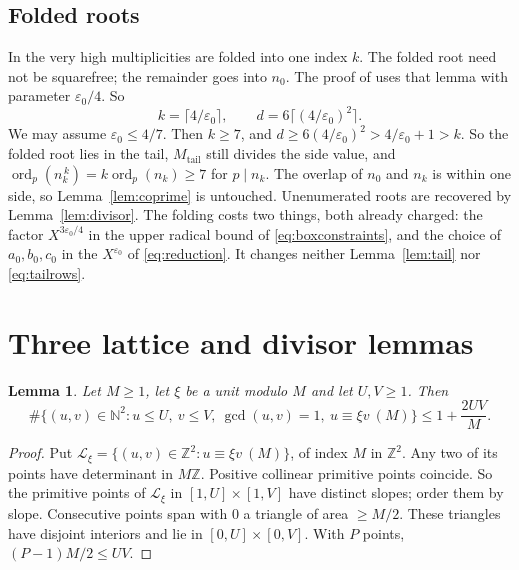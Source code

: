 \documentclass{amsart}
\newtheorem{lemma}{Lemma}[section]
\numberwithin{equation}{section}
\numberwithin{table}{section}
\newcommand{\Z}{\mathbb{Z}}
\newcommand{\N}{\mathbb{N}}
\begin{document}
\subsection{Folded roots}\label{sec:fold}
In \cite[Lemma~2.2]{BBLT} the very high multiplicities are folded into one
index $k$. The folded root need not be squarefree; the remainder goes into
$n_0$. The proof of \cite[Proposition~2.1]{BBLT} uses that lemma with
parameter $\varepsilon_0/4$. So
\[
 k=\lceil4/\varepsilon_0\rceil,\qquad d=6\lceil(4/\varepsilon_0)^{2}\rceil .
\]
We may assume $\varepsilon_0\le4/7$. Then $k\ge7$, and
$d\ge6(4/\varepsilon_0)^2>4/\varepsilon_0+1>k$. So the folded root lies in the
tail, $M_{\mathrm{tail}}$ still divides the side value, and
$\operatorname{ord}_p(n_k^{\,k})=k\operatorname{ord}_p(n_k)\ge7$ for
$p\mid n_k$. The overlap of $n_0$ and $n_k$ is within one side, so
Lemma~\ref{lem:coprime} is untouched. Unenumerated roots are recovered by
Lemma~\ref{lem:divisor}. The folding costs two things, both already charged: the factor
$X^{3\varepsilon_0/4}$ in the upper radical bound of \eqref{eq:boxconstraints},
and the choice of $a_0,b_0,c_0$ in the $X^{\varepsilon_0}$ of
\eqref{eq:reduction}. It changes neither
Lemma~\ref{lem:tail} nor \eqref{eq:tailrows}.




\section{Three lattice and divisor lemmas}\label{sec:lat}

\begin{lemma}\label{lem:farey}
Let $M\ge1$, let $\xi$ be a unit modulo $M$ and let $U,V\ge1$. Then
\begin{equation}\label{eq:farey}
 \#\{(u,v)\in\N^2:u\le U,\ v\le V,\ \gcd(u,v)=1,\ u\equiv\xi v\ (M)\}
 \le1+\frac{2UV}{M}.
\end{equation}
\end{lemma}

\begin{proof}
Put $\mathcal L_\xi=\{(u,v)\in\Z^2:u\equiv\xi v\ (M)\}$, of index $M$ in
$\Z^2$. Any two of its points have determinant in $M\Z$. Positive collinear
primitive points coincide. So the primitive points of $\mathcal L_\xi$ in
$[1,U]\times[1,V]$ have distinct slopes; order them by slope. Consecutive
points span with $0$ a triangle of area $\ge M/2$. These triangles have
disjoint interiors and lie in $[0,U]\times[0,V]$. With $P$ points,
$(P-1)M/2\le UV$.
\end{proof}
\end{document}
